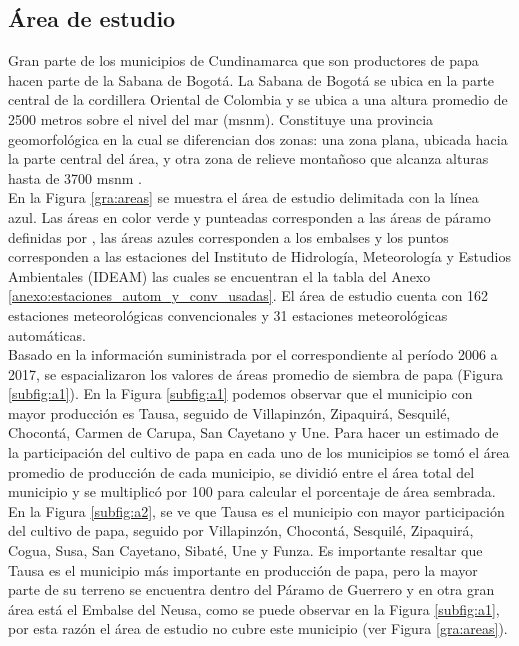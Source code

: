 \subsection{Área de estudio}


Gran parte de los municipios de Cundinamarca que son productores de papa hacen parte de la Sabana de Bogotá. La Sabana de Bogotá se ubica en la parte central de la cordillera Oriental de Colombia y se ubica a una altura promedio de 2500 metros sobre el nivel del mar (msnm). Constituye una provincia geomorfológica en la cual se diferencian dos zonas: una zona plana, ubicada hacia la parte central del área, y otra zona de relieve montañoso que alcanza alturas hasta de 3700 msnm \citep{hermelin2007entorno}.\\

En la Figura \ref{gra:areas} se muestra el área de estudio delimitada con la línea azul. Las áreas en color verde y punteadas corresponden a las áreas de páramo definidas por \citet{Cortes-Duque2013}, las áreas azules corresponden a los embalses y los puntos corresponden a las estaciones del Instituto de Hidrología, Meteorología y Estudios Ambientales (IDEAM) las cuales se encuentran el la tabla del Anexo \ref{anexo:estaciones_autom_y_conv_usadas}. El área de estudio cuenta con 162 estaciones meteorológicas convencionales y 31  estaciones meteorológicas automáticas.\\ %


Basado en la información suministrada por el \citet{madr2017} correspondiente al período 2006 a 2017, se espacializaron los valores de áreas promedio de siembra de papa (Figura \ref{subfig:a1}). En la Figura \ref{subfig:a1} podemos observar que el municipio con mayor producción es Tausa, seguido de Villapinzón, Zipaquirá, Sesquilé, Chocontá, Carmen de Carupa, San Cayetano y Une. Para hacer un estimado de la participación del cultivo de papa en cada uno de los municipios se tomó el área promedio de producción de cada municipio, se dividió entre el área total del municipio y se multiplicó por 100 para calcular el porcentaje de área sembrada. En la Figura \ref{subfig:a2}, se ve que Tausa es el municipio con mayor participación del cultivo de papa, seguido por Villapinzón, Chocontá, Sesquilé, Zipaquirá, Cogua, Susa, San Cayetano, Sibaté, Une y Funza. Es importante resaltar que Tausa es el municipio más importante en producción de papa, pero la mayor parte de su terreno se encuentra dentro del Páramo de Guerrero y en otra gran área está el Embalse del Neusa, como se puede observar en la Figura \ref{subfig:a1}, por esta razón el área de estudio no cubre este municipio (ver Figura \ref{gra:areas}).


